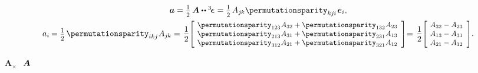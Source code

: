 {\nopagebreak\vspace{-0.5em}\begin{equation*}\begin{array}{c}
\bm{a} = \smalldisplaystyleonehalf \, \bm{A} \dotdotp \permutationsparitytensor =
\smalldisplaystyleonehalf \hspace{.25ex} A_{j\hspace{-0.1ex}k} \permutationsparity_{kj\hspace{-0.06ex}i} \hspace{.2ex} \bm{e}_i , \\[0.64em]
a_{i} \hspace{-0.16ex} = \smalldisplaystyleonehalf \hspace{.32ex} \permutationsparity_{ikj} \hspace{.1ex} A_{j\hspace{-0.1ex}k} = \hspace{.1em}
\displaystyle \onehalf \scalebox{0.9}[0.9]{$\left[\hspace{-0.25ex} \begin{array}{c}
\permutationsparity_{123} \hspace{.1ex} A_{32} + \permutationsparity_{132} \hspace{.1ex} A_{23} \\
\permutationsparity_{213} \hspace{.1ex} A_{31} + \permutationsparity_{231} \hspace{.1ex} A_{13} \\
\permutationsparity_{312} \hspace{.1ex} A_{21} + \permutationsparity_{321} \hspace{.1ex} A_{12}
\end{array} \right]$} \hspace{-0.2em} = \hspace{.1em}
\displaystyle \onehalf \scalebox{0.9}[0.9]{$\left[\hspace{-0.3ex} \begin{array}{c}
A_{32} - A_{23} \\
A_{13} - A_{31} \\
A_{21} - A_{12}
\end{array} \right]$} .
\vspace{.1em}\end{array}\end{equation*}

${\!\bm{A}_{\!\bm{\times}}}$
~${\hspace{-0.2ex}\bm{A}}$

}
